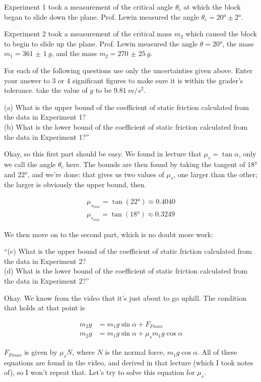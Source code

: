 \documentclass[8.01x]{subfiles}
\begin{document}
Experiment 1 took a measurement of the critical angle $\theta_c$ at which the block began to slide down the plane. Prof. Lewin measured the angle $\theta_c = \ang{20} \pm \ang{2}$.

Experiment 2 took a measurement of the critical mass $m_2$ which caused the block to begin to slide up the plane. Prof. Lewin measured the angle $\theta = \ang{20}$, the mass $m_1 = \SI{361(1)}{g}$, and the mass $m_2 = \SI{270(25)}{g}$.

For each of the following questions use only the uncertainties given above. Enter your answer to 3 or 4 significant figures to make sure it is within the grader's tolerance. take the value of $g$ to be $\SI{9.81}{m/s^2}$.

(a) What is the upper bound of the coefficient of static friction calculated from the data in Experiment 1?\\
(b) What is the lower bound of the coefficient of static friction calculated from the data in Experiment 1?''

Okay, so this first part should be easy. We found in lecture that $\mu_s = \tan \alpha$, only we call the angle $\theta_c$ here. The bounds are then found by taking the tangent of $\ang{18}$ and $\ang{22}$, and we're done: that gives us two values of $\mu_s$, one larger than the other; the larger is obviously the upper bound, then.

\begin{align}
\mu_{s_{max}} = \tan(\ang{22}) \approx 0.4040\\
\mu_{s_{min}} = \tan(\ang{18}) \approx 0.3249
\end{align}

We then move on to the second part, which is no doubt more work:

``(c) What is the upper bound of the coefficient of static friction calculated from the data in Experiment 2?\\
(d) What is the lower bound of the coefficient of static friction calculated from the data in Experiment 2?''

Okay. We know from the video that it's just about to go uphill. The condition that holds at that point is

\begin{align}
m_2 g &= m_1 g \sin \alpha + F_{Fmax}\\
m_2 g &= m_1 g \sin \alpha + \mu_s m_1 g \cos \alpha
\end{align}

$F_{Fmax}$ is given by $\mu_s N$, where $N$ is the normal force, $m_1 g \cos \alpha$. All of these equations are found in the video, and derived in that lecture (which I took notes of), so I won't repeat that. Let's try to solve this equation for $\mu_s$.
\end{document}
